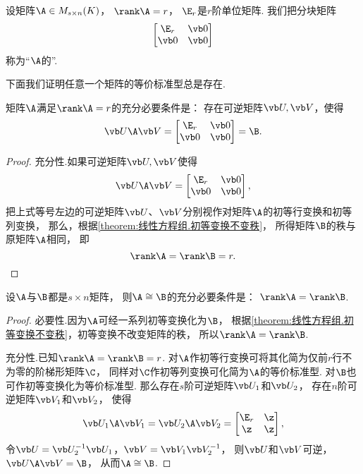 \begin{definition}
设矩阵\(\A \in M_{s \times n}(K)\)，
\(\rank\A = r\)，
\(\E_r\)是\(r\)阶单位矩阵.
我们把分块矩阵\[
	\begin{bmatrix}
		\E_r & \vb0 \\
		\vb0 & \vb0
	\end{bmatrix}
\]
称为“\(\A\)的”.
\end{definition}

下面我们证明任意一个矩阵的等价标准型总是存在.
\begin{theorem}\label{theorem:矩阵乘积的秩.等价标准型的存在性}
矩阵\(\A\)满足\(\rank\A=r\)的充分必要条件是：
存在可逆矩阵\(\P,\Q\)，使得\[
	\P \A \Q
	= \begin{bmatrix}
		\E_r & \vb0 \\
		\vb0 & \vb0
	\end{bmatrix} = \B.
\]
\begin{proof}
充分性.如果可逆矩阵\(\P,\Q\)使得\[
	\P\A\Q
	= \begin{bmatrix}
		\E_r & \vb0 \\
		\vb0 & \vb0
	\end{bmatrix},
\]
把上式等号左边的可逆矩阵\(\P\)、\(\Q\)分别视作对矩阵\(\A\)的初等行变换和初等列变换，
那么，根据\cref{theorem:线性方程组.初等变换不变秩}，
所得矩阵\(\B\)的秩与原矩阵\(\A\)相同，
即\[
	\rank\A = \rank\B = r.
	\qedhere
\]
\end{proof}
\end{theorem}

\begin{theorem}
设\(\A\)与\(\B\)都是\(s \times n\)矩阵，
则\(\A \cong \B\)的充分必要条件是：
\(\rank\A = \rank\B\).
\begin{proof}
必要性.因为\(\A\)可经一系列初等变换化为\(\B\)，
根据\cref{theorem:线性方程组.初等变换不变秩}，初等变换不改变矩阵的秩，
所以\(\rank\A = \rank\B\).

充分性.已知\(\rank\A = \rank\B = r\).
对\(\A\)作初等行变换可将其化简为仅前\(r\)行不为零的阶梯形矩阵\(\C\)，
同样对\(\C\)作初等列变换可化简为\(\A\)的等价标准型.
对\(\B\)也可作初等变换化为等价标准型.
那么存在\(s\)阶可逆矩阵\(\P_1\)和\(\P_2\)，
存在\(n\)阶可逆矩阵\(\Q_1\)和\(\Q_2\)，
使得\[
	\P_1 \A \Q_1 = \P_2 \A \Q_2
	= \begin{bmatrix} \E_r & \z \\ \z & \z \end{bmatrix},
\]
令\(\P = \P_2^{-1} \P_1\)，\(\Q = \Q_1 \Q_2^{-1}\)，
则\(\P\)和\(\Q\)可逆，
\(\P \A \Q = \B\)，
从而\(\A \cong \B\).
\end{proof}
\end{theorem}

